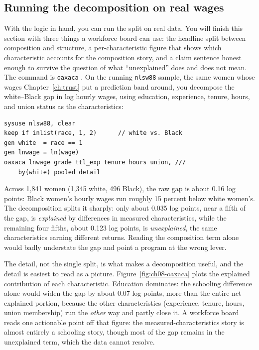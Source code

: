 \documentclass[
    a4paper,
    fontsize=10pt,
    twoside=true,
    numbers=noenddot,
]{kaobook}
\begin{document}
\subsection{Running the decomposition on real wages}\label{sec:oaxaca-run}
With the logic in hand, you can run the split on real data. You will finish this section with three things a workforce board can use: the headline split between composition and structure, a per-characteristic figure that shows which characteristic accounts for the composition story, and a claim sentence honest enough to survive the question of what \enquote{unexplained} does and does not mean. The command is \texttt{oaxaca} \parencite{jann2008oaxaca}. On the running \texttt{nlsw88} sample, the same women whose wages Chapter~\ref{ch:trust} put a prediction band around, you decompose the white--Black gap in log hourly wages, using education, experience, tenure, hours, and union status as the characteristics:
\par
{\footnotesize
\begin{verbatim}
sysuse nlsw88, clear
keep if inlist(race, 1, 2)      // white vs. Black
gen white  = race == 1
gen lnwage = ln(wage)
oaxaca lnwage grade ttl_exp tenure hours union, ///
    by(white) pooled detail
\end{verbatim}
}
Across 1{,}841 women (1{,}345 white, 496 Black), the raw gap is about 0.16 log points: Black women's hourly wages run roughly 15 percent below white women's. The decomposition splits it sharply: only about 0.035 log points, near a fifth of the gap, is \emph{explained} by differences in measured characteristics, while the remaining four fifths, about 0.123 log points, is \emph{unexplained}, the same characteristics earning different returns. Reading the composition term alone would badly understate the gap and point a program at the wrong lever.

The detail, not the single split, is what makes a decomposition useful, and the detail is easiest to read as a picture. Figure~\ref{fig:ch08-oaxaca} plots the explained contribution of each characteristic. Education dominates: the schooling difference alone would widen the gap by about 0.07 log points, more than the entire net explained portion, because the other characteristics (experience, tenure, hours, union membership) run the \emph{other} way and partly close it. A workforce board reads one actionable point off that figure: the measured-characteristics story is almost entirely a schooling story, though most of the gap remains in the unexplained term, which the data cannot resolve.
\end{document}
